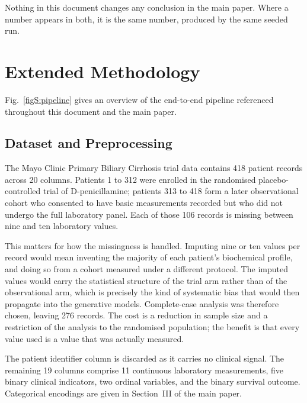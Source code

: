 \documentclass[journal,onecolumn]{IEEEtran}
\begin{document}
Nothing in this document changes any conclusion in the main paper. Where a number appears in both, it is the same number, produced by the same seeded run.

\section{Extended Methodology}

Fig.~\ref{figS:pipeline} gives an overview of the end-to-end pipeline referenced throughout this document and the main paper.

\subsection{Dataset and Preprocessing}

The Mayo Clinic Primary Biliary Cirrhosis trial data contains 418 patient records across 20 columns. Patients 1 to 312 were enrolled in the randomised placebo-controlled trial of D-penicillamine; patients 313 to 418 form a later observational cohort who consented to have basic measurements recorded but who did not undergo the full laboratory panel. Each of those 106 records is missing between nine and ten laboratory values.

This matters for how the missingness is handled. Imputing nine or ten values per record would mean inventing the majority of each patient's biochemical profile, and doing so from a cohort measured under a different protocol. The imputed values would carry the statistical structure of the trial arm rather than of the observational arm, which is precisely the kind of systematic bias that would then propagate into the generative models. Complete-case analysis was therefore chosen, leaving 276 records. The cost is a reduction in sample size and a restriction of the analysis to the randomised population; the benefit is that every value used is a value that was actually measured.

The patient identifier column is discarded as it carries no clinical signal. The remaining 19 columns comprise 11 continuous laboratory measurements, five binary clinical indicators, two ordinal variables, and the binary survival outcome. Categorical encodings are given in Section~III of the main paper.
\end{document}
